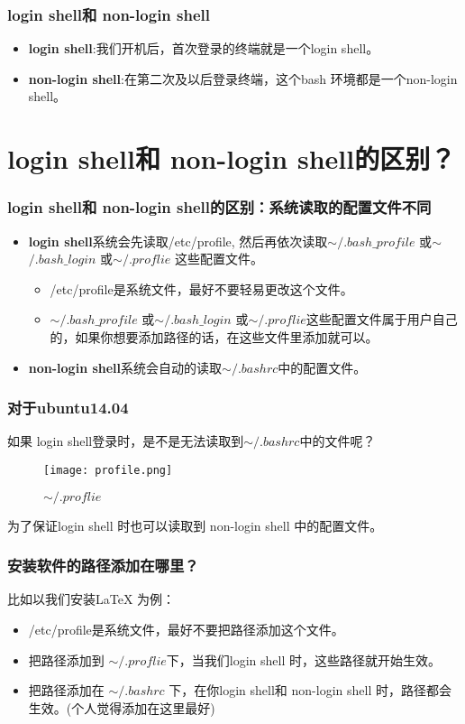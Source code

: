 \documentclass[notheorems,mathserif,table,compress,10pt]{beamer}  %
\begin{document}
\begin{frame}
\frametitle{login shell和 non-login shell}
\begin{itemize}
\item  {\color{blue}\textbf{ login shell}}:我们开机后，首次登录的终端就是一个login  shell。
\item  {\color{blue}\textbf{ non-login shell}}:在第二次及以后登录终端，这个bash 环境都是一个non-login shell。
\end{itemize}
\end{frame}  

\section{login shell和 non-login shell的区别？}
\begin{frame}
\frametitle{login shell和 non-login shell的区别：系统读取的配置文件不同}
\begin{itemize}
\item  {\color{blue}\textbf{ login shell}}系统会先读取/etc/profile, 然后再依次读取$\sim$$/.bash\_profile$ 或$\sim$$/.bash\_login$ 或$\sim$$/.proflie$ 这些配置文件。
\begin{itemize}
\item  /etc/profile是系统文件，最好不要轻易更改这个文件。
\item $\sim$$/.bash\_profile$ 或$\sim$$/.bash\_login$ 或$\sim$$/.proflie$这些配置文件属于用户自己的，如果你想要添加路径的话，在这些文件里添加就可以。
\end{itemize}
\item  {\color{blue}\textbf{ non-login shell}}系统会自动的读取$\sim$$/.bashrc$中的配置文件。
\end{itemize}
 \end{frame}



\begin{frame}
\frametitle{对于ubuntu14.04}
如果 login shell登录时，是不是无法读取到$\sim$$/.bashrc$中的文件呢？
\begin{figure}\centering 
  \begin{minipage}[t]{0.9\linewidth} 
    
    \texttt{[image: profile.png]}
\caption{$\sim$$/.proflie$}
  \end{minipage} 
   \end{figure} 
 为了保证login shell 时也可以读取到 non-login shell 中的配置文件。
 \end{frame}
\begin{frame}

\frametitle{安装软件的路径添加在哪里？}
比如以我们安装\LaTeX{} 为例：
\begin{itemize}
\item  /etc/profile是系统文件，最好不要把路径添加这个文件。
\item 把路径添加到  $\sim$$/.proflie$下，当我们login shell 时，这些路径就开始生效。
\item 把路径添加在 $\sim$$/.bashrc$ 下，在你login shell和 non-login shell 时，路径都会生效。(个人觉得添加在这里最好)
\end{itemize}
 \end{frame}
\end{document}
